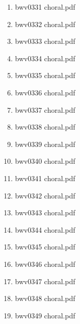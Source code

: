 \documentclass[11pt]{article}
\begin{document}
\begin{enumerate}
\begin{enumerate}
\begin{enumerate}
\begin{enumerate}
\item bwv0331 choral.pdf
\label{sec-1-1-1-1-44-6-7-2-4-80}

\item bwv0332 choral.pdf
\label{sec-1-1-1-1-44-6-7-2-4-81}

\item bwv0333 choral.pdf
\label{sec-1-1-1-1-44-6-7-2-4-82}

\item bwv0334 choral.pdf
\label{sec-1-1-1-1-44-6-7-2-4-83}

\item bwv0335 choral.pdf
\label{sec-1-1-1-1-44-6-7-2-4-84}

\item bwv0336 choral.pdf
\label{sec-1-1-1-1-44-6-7-2-4-85}

\item bwv0337 choral.pdf
\label{sec-1-1-1-1-44-6-7-2-4-86}

\item bwv0338 choral.pdf
\label{sec-1-1-1-1-44-6-7-2-4-87}

\item bwv0339 choral.pdf
\label{sec-1-1-1-1-44-6-7-2-4-88}

\item bwv0340 choral.pdf
\label{sec-1-1-1-1-44-6-7-2-4-89}

\item bwv0341 choral.pdf
\label{sec-1-1-1-1-44-6-7-2-4-90}

\item bwv0342 choral.pdf
\label{sec-1-1-1-1-44-6-7-2-4-91}

\item bwv0343 choral.pdf
\label{sec-1-1-1-1-44-6-7-2-4-92}

\item bwv0344 choral.pdf
\label{sec-1-1-1-1-44-6-7-2-4-93}

\item bwv0345 choral.pdf
\label{sec-1-1-1-1-44-6-7-2-4-94}

\item bwv0346 choral.pdf
\label{sec-1-1-1-1-44-6-7-2-4-95}

\item bwv0347 choral.pdf
\label{sec-1-1-1-1-44-6-7-2-4-96}

\item bwv0348 choral.pdf
\label{sec-1-1-1-1-44-6-7-2-4-97}

\item bwv0349 choral.pdf
\label{sec-1-1-1-1-44-6-7-2-4-98}


\end{enumerate}
\end{enumerate}
\end{enumerate}
\end{enumerate}
\end{document}
